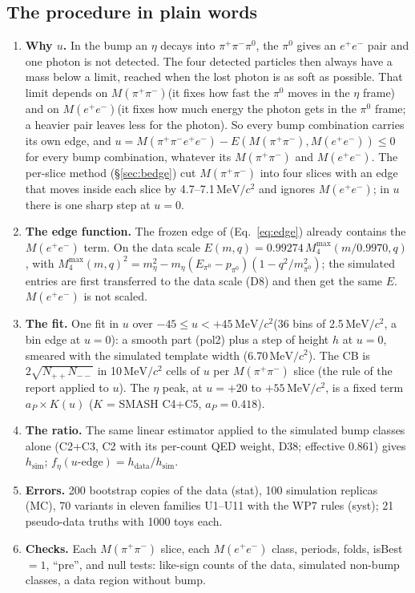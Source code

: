 \documentclass[11pt,a4paper]{article}
\newcommand{\piz}{\ensuremath{\pi^{0}}\xspace}
\newcommand{\ee}{\ensuremath{e^{+}e^{-}}\xspace}
\newcommand{\pipi}{\ensuremath{\pi^{+}\pi^{-}}\xspace}
\newcommand{\Mfour}{\ensuremath{M(\pi^{+}\pi^{-}e^{+}e^{-})}\xspace}
\newcommand{\Mee}{\ensuremath{M(e^{+}e^{-})}\xspace}
\newcommand{\Mpipi}{\ensuremath{M(\pi^{+}\pi^{-})}\xspace}
\newcommand{\MeVcc}{\ensuremath{\mathrm{MeV}/c^{2}}\xspace}
\newcommand{\code}[1]{\texttt{\detokenize{#1}}}
\newcommand{\aP}{\ensuremath{a_P}\xspace}
\begin{document}
\subsection{The procedure in plain words}
\label{sec:edgeu-proc}
\begin{enumerate}\setlength{\itemsep}{1pt}
\item \textbf{Why $u$.} In the bump an $\eta$ decays into \pipi\piz, the \piz gives an \ee pair and one photon is not detected. The four detected
      particles then always have a mass below a limit, reached when the lost photon is as soft as possible. That limit depends on \Mpipi (it fixes
      how fast the \piz moves in the $\eta$ frame) and on \Mee (it fixes how much energy the photon gets in the \piz frame; a heavier pair leaves
      less for the photon). So every bump combination carries its own edge, and $u=\Mfour-E(\Mpipi,\Mee)\le0$ for every bump combination, whatever its \Mpipi and
      \Mee. The per-slice method (\S\ref{sec:bedge}) cut \Mpipi into four slices with an edge that moves inside each slice by 4.7--7.1\,\MeVcc and
      ignores \Mee; in $u$ there is one sharp step at $u=0$.
\item \textbf{The edge function.} The frozen edge of \code{defs.h} (Eq.~\ref{eq:edge}) already contains the \Mee term. On the data scale
      $E(m,q)=0.99274\,M_4^{\max}(m/0.9970,q)$, with $M_4^{\max}(m,q)^2=m_\eta^2-m_\eta(E_{\piz}-p_{\piz})(1-q^2/m_{\piz}^2)$; the simulated entries
      are first transferred to the data scale (D8) and then get the same $E$. \Mee is not scaled.
\item \textbf{The fit.} One fit in $u$ over $-45\le u<+45$\,\MeVcc (36 bins of 2.5\,\MeVcc, a bin edge at $u=0$): a smooth part (pol2) plus a step
      of height $h$ at $u=0$, smeared with the simulated template width (6.70\,\MeVcc). The CB is $2\sqrt{N_{++}N_{--}}$ in 10\,\MeVcc cells of $u$ per
      \Mpipi slice (the rule of the report applied to $u$). The $\eta$ peak, at $u=+20$ to $+55$\,\MeVcc, is a fixed term $\aP\times K(u)$ ($K$ =
      SMASH C4+C5, $\aP=0.418$).
\item \textbf{The ratio.} The same linear estimator applied to the simulated bump classes alone (C2+C3, C2 with its per-count QED weight, D38;
      effective 0.861) gives $h_{\mathrm{sim}}$; $f_\eta(u\text{-edge})=h_{\mathrm{data}}/h_{\mathrm{sim}}$.
\item \textbf{Errors.} 200 bootstrap copies of the data (stat), 100 simulation replicas (MC), 70 variants in eleven families U1--U11 with the WP7
      rules (syst); 21 pseudo-data truths with 1000 toys each.
\item \textbf{Checks.} Each \Mpipi slice, each \Mee class, periods, folds, isBest $=1$, ``pre'', and null tests: like-sign counts of the data, simulated
      non-bump classes, a data region without bump.
\end{enumerate}
\end{document}
